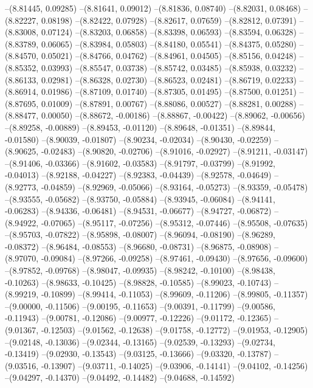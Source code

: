 --(8.81445, 0.09285)
--(8.81641, 0.09012)
--(8.81836, 0.08740)
--(8.82031, 0.08468)
--(8.82227, 0.08198)
--(8.82422, 0.07928)
--(8.82617, 0.07659)
--(8.82812, 0.07391)
--(8.83008, 0.07124)
--(8.83203, 0.06858)
--(8.83398, 0.06593)
--(8.83594, 0.06328)
--(8.83789, 0.06065)
--(8.83984, 0.05803)
--(8.84180, 0.05541)
--(8.84375, 0.05280)
--(8.84570, 0.05021)
--(8.84766, 0.04762)
--(8.84961, 0.04505)
--(8.85156, 0.04248)
--(8.85352, 0.03993)
--(8.85547, 0.03738)
--(8.85742, 0.03485)
--(8.85938, 0.03232)
--(8.86133, 0.02981)
--(8.86328, 0.02730)
--(8.86523, 0.02481)
--(8.86719, 0.02233)
--(8.86914, 0.01986)
--(8.87109, 0.01740)
--(8.87305, 0.01495)
--(8.87500, 0.01251)
--(8.87695, 0.01009)
--(8.87891, 0.00767)
--(8.88086, 0.00527)
--(8.88281, 0.00288)
--(8.88477, 0.00050)
--(8.88672, -0.00186)
--(8.88867, -0.00422)
--(8.89062, -0.00656)
--(8.89258, -0.00889)
--(8.89453, -0.01120)
--(8.89648, -0.01351)
--(8.89844, -0.01580)
--(8.90039, -0.01807)
--(8.90234, -0.02034)
--(8.90430, -0.02259)
--(8.90625, -0.02483)
--(8.90820, -0.02706)
--(8.91016, -0.02927)
--(8.91211, -0.03147)
--(8.91406, -0.03366)
--(8.91602, -0.03583)
--(8.91797, -0.03799)
--(8.91992, -0.04013)
--(8.92188, -0.04227)
--(8.92383, -0.04439)
--(8.92578, -0.04649)
--(8.92773, -0.04859)
--(8.92969, -0.05066)
--(8.93164, -0.05273)
--(8.93359, -0.05478)
--(8.93555, -0.05682)
--(8.93750, -0.05884)
--(8.93945, -0.06084)
--(8.94141, -0.06283)
--(8.94336, -0.06481)
--(8.94531, -0.06677)
--(8.94727, -0.06872)
--(8.94922, -0.07065)
--(8.95117, -0.07256)
--(8.95312, -0.07446)
--(8.95508, -0.07635)
--(8.95703, -0.07822)
--(8.95898, -0.08007)
--(8.96094, -0.08190)
--(8.96289, -0.08372)
--(8.96484, -0.08553)
--(8.96680, -0.08731)
--(8.96875, -0.08908)
--(8.97070, -0.09084)
--(8.97266, -0.09258)
--(8.97461, -0.09430)
--(8.97656, -0.09600)
--(8.97852, -0.09768)
--(8.98047, -0.09935)
--(8.98242, -0.10100)
--(8.98438, -0.10263)
--(8.98633, -0.10425)
--(8.98828, -0.10585)
--(8.99023, -0.10743)
--(8.99219, -0.10899)
--(8.99414, -0.11053)
--(8.99609, -0.11206)
--(8.99805, -0.11357)
--(9.00000, -0.11506)
--(9.00195, -0.11653)
--(9.00391, -0.11799)
--(9.00586, -0.11943)
--(9.00781, -0.12086)
--(9.00977, -0.12226)
--(9.01172, -0.12365)
--(9.01367, -0.12503)
--(9.01562, -0.12638)
--(9.01758, -0.12772)
--(9.01953, -0.12905)
--(9.02148, -0.13036)
--(9.02344, -0.13165)
--(9.02539, -0.13293)
--(9.02734, -0.13419)
--(9.02930, -0.13543)
--(9.03125, -0.13666)
--(9.03320, -0.13787)
--(9.03516, -0.13907)
--(9.03711, -0.14025)
--(9.03906, -0.14141)
--(9.04102, -0.14256)
--(9.04297, -0.14370)
--(9.04492, -0.14482)
--(9.04688, -0.14592)
